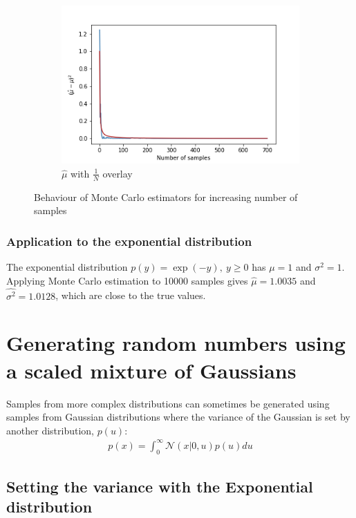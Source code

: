 \documentclass[a4paper]{article}
\begin{document}
\begin{figure}[h]
\begin{subfigure}[b]{0.3\textwidth}
        \includegraphics[width=\textwidth]{figures/monte_carlo_mean_best_fit.png}
        \caption{$\hat{\mu}$ with $\frac{1}{N}$ overlay}
        \label{fig:monte_carlo_mean_best_fit}
    \end{subfigure}
    \caption{Behaviour of Monte Carlo estimators for increasing number of samples}
    \label{fig:monte_carlo_convergence}
\end{figure}

\subsubsection{Application to the exponential distribution}
The exponential distribution $p(y) = \exp(-y), \ y \geq 0$ has $\mu = 1$ and $\sigma^2 = 1$.
Applying Monte Carlo estimation to 10000 samples gives $\hat{\mu} = 1.0035$ and $\hat{\sigma^2} = 1.0128$, which are
close to the true values.



\section{Generating random numbers using a scaled mixture of Gaussians}

Samples from more complex distributions can sometimes be generated using samples from Gaussian distributions
where the variance of the Gaussian is set by another distribution, $p(u)$:
\begin{align}\label{eq:marginalisation_of_mixed_gaussians}
    p(x) = \int_0^{\infty} \mathcal{N}(x | 0, u) p(u) du
\end{align}

\subsection{Setting the variance with the Exponential distribution}
\end{document}
